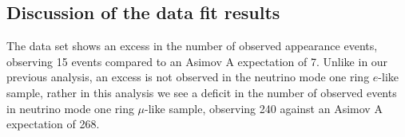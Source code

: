 %
%
%
%
%
%
%
%

\subsection {Discussion of the \RunPeriod data fit results}
\label{sec:results:discussion}

The \nueCConepi data set shows an excess in the number of observed appearance events, observing 15 events compared to an Asimov A expectation of 7. Unlike in our previous analysis, an excess is not observed in the neutrino mode one ring $e$-like sample, rather in this analysis we see a deficit in the number of observed events in neutrino mode one ring $\mu$-like sample, observing 240 against an Asimov A expectation of 268.

